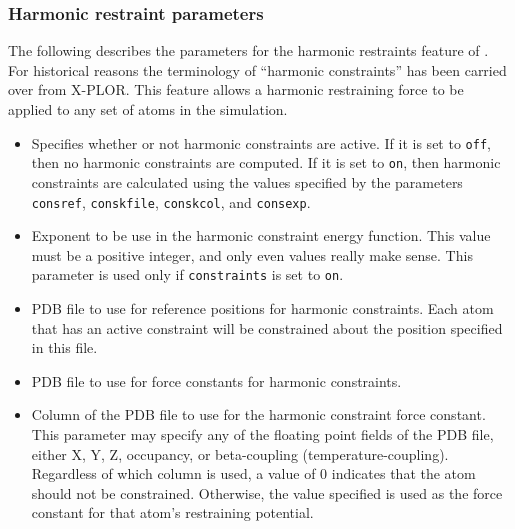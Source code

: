 \subsubsection{Harmonic restraint parameters}

The following describes the parameters for the 
harmonic restraints feature of \NAMD.
For historical reasons the terminology of 
``harmonic constraints'' has been carried over from X-PLOR.  
This feature allows a harmonic restraining force to be applied 
to any set of atoms in the simulation.

\begin{itemize}

\item
{}
{Specifies whether or not harmonic constraints are active.  If it 
is set to {\tt off}, then no harmonic constraints are computed.  
If it is set to {\tt on}, then 
harmonic constraints are calculated using the values specified 
by the parameters {\tt consref}, {\tt conskfile}, {\tt conskcol}, 
and {\tt consexp}.}

\item
{}
{Exponent to be use in the harmonic constraint energy function.  
This value must be a positive integer, and only even values really make 
sense.  This parameter is used only if {\tt constraints} is set to 
{\tt on}.}

\item
{}
{PDB file to use for reference positions for harmonic constraints.  
Each atom that has an active constraint will be constrained about 
the position specified in this file.}

\item
{}
{PDB file to use for force constants for 
harmonic constraints.}

\item
{}
{Column of the PDB file to use for the harmonic constraint force constant.
This parameter may specify any of the floating point fields of the PDB file, 
either X, Y, Z, occupancy, or beta-coupling (temperature-coupling).  
Regardless of which column is used, a value of 0 indicates that the atom 
should not be constrained.  
Otherwise, the value specified is used as the force constant for 
that atom's restraining potential.}


\end{itemize}
